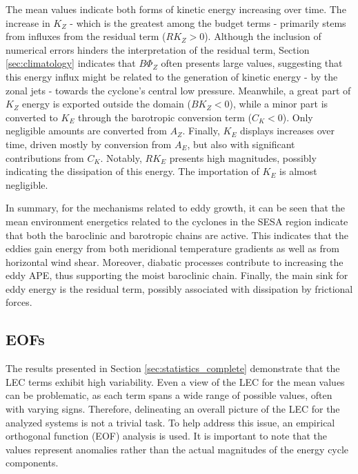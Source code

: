The mean values indicate both forms of kinetic energy increasing over time. The increase in $K_Z$ - which is the greatest among the budget terms - primarily stems from influxes from the residual term ($RK_Z > 0$). Although the inclusion of numerical errors hinders the interpretation of the residual term, Section \ref{sec:climatology} indicates that $B\Phi_Z$ often presents large values, suggesting that this energy influx might be related to the generation of kinetic energy - by the zonal jets - towards the cyclone's central low pressure. Meanwhile, a great part of $K_Z$ energy is exported outside the domain ($BK_Z < 0$), while a minor part is converted to $K_E$ through the barotropic conversion term ($C_K < 0$). Only negligible amounts are converted from $A_Z$. Finally, $K_E$ displays increases over time, driven mostly by conversion from $A_E$, but also with significant contributions from $C_K$. Notably, $RK_E$ presents high magnitudes, possibly indicating the dissipation of this energy. The importation of $K_E$ is almost negligible.

In summary, for the mechanisms related to eddy growth, it can be seen that the mean environment energetics related to the cyclones in the SESA region indicate that both the baroclinic and barotropic chains are active. This indicates that the eddies gain energy from both meridional temperature gradients as well as from horizontal wind shear. Moreover, diabatic processes contribute to increasing the eddy APE, thus supporting the moist baroclinic chain. Finally, the main sink for eddy energy is the residual term, possibly associated with dissipation by frictional forces.

\subsection{EOFs}\label{sec:eof_complete}

The results presented in Section \ref{sec:statistics_complete} demonstrate that the LEC terms exhibit high variability. Even a view of the LEC for the mean values can be problematic, as each term spans a wide range of possible values, often with varying signs. Therefore, delineating an overall picture of the LEC for the analyzed systems is not a trivial task. To help address this issue, an empirical orthogonal function (EOF) analysis is used. It is important to note that the values represent anomalies rather than the actual magnitudes of the energy cycle components.

